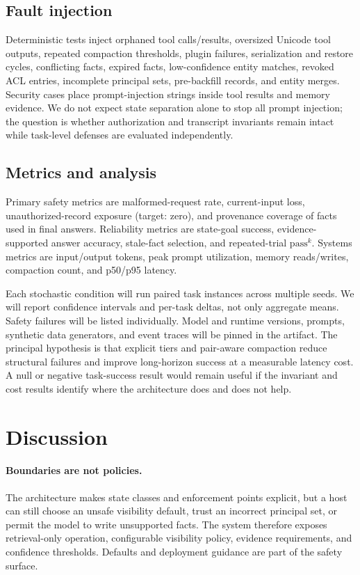 \documentclass[sigplan,10pt,anonymous,review]{acmart}
\begin{document}
\subsection{Fault injection}

Deterministic tests inject orphaned tool calls/results, oversized Unicode tool
outputs, repeated compaction thresholds, plugin failures, serialization and
restore cycles, conflicting facts, expired facts, low-confidence entity
matches, revoked ACL entries, incomplete principal sets, pre-backfill records,
and entity merges.  Security cases place prompt-injection strings inside tool
results and memory evidence.  We do not expect state separation alone to stop
all prompt injection; the question is whether authorization and transcript
invariants remain intact while task-level defenses are evaluated independently.

\subsection{Metrics and analysis}

Primary safety metrics are malformed-request rate, current-input loss,
unauthorized-record exposure (target: zero), and provenance coverage of facts
used in final answers.  Reliability metrics are state-goal success,
evidence-supported answer accuracy, stale-fact selection, and repeated-trial
$\mathrm{pass}^k$.  Systems metrics are input/output tokens, peak prompt
utilization, memory reads/writes, compaction count, and p50/p95 latency.

Each stochastic condition will run paired task instances across multiple
seeds.  We will report confidence intervals and per-task deltas, not only
aggregate means.  Safety failures will be listed individually.  Model and
runtime versions, prompts, synthetic data generators, and event traces will be
pinned in the artifact.  The principal hypothesis is that explicit tiers and
pair-aware compaction reduce structural failures and improve long-horizon
success at a measurable latency cost.  A null or negative task-success result
would remain useful if the invariant and cost results identify where the
architecture does and does not help.

\section{Discussion}

\paragraph{Boundaries are not policies.}
The architecture makes state classes and enforcement points explicit, but a
host can still choose an unsafe visibility default, trust an incorrect
principal set, or permit the model to write unsupported facts.  The system
therefore exposes retrieval-only operation, configurable visibility policy,
evidence requirements, and confidence thresholds.  Defaults and deployment
guidance are part of the safety surface.
\end{document}

